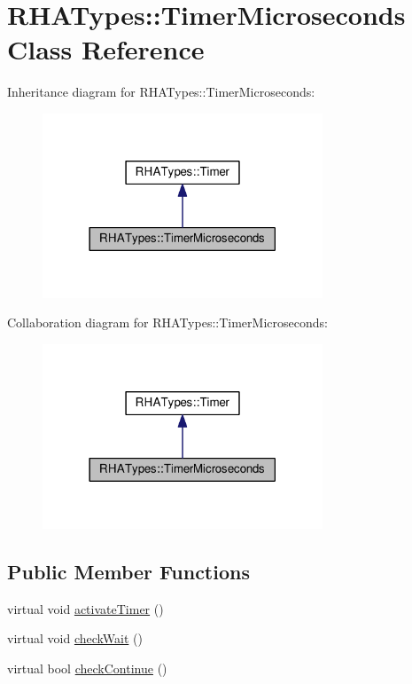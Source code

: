 \hypertarget{classRHATypes_1_1TimerMicroseconds}{}\section{R\+H\+A\+Types\+:\+:Timer\+Microseconds Class Reference}
\label{classRHATypes_1_1TimerMicroseconds}


Inheritance diagram for R\+H\+A\+Types\+:\+:Timer\+Microseconds\+:
\nopagebreak
\begin{figure}[H]
\begin{center}
\leavevmode
\includegraphics[width=237pt]{classRHATypes_1_1TimerMicroseconds__inherit__graph}
\end{center}
\end{figure}


Collaboration diagram for R\+H\+A\+Types\+:\+:Timer\+Microseconds\+:
\nopagebreak
\begin{figure}[H]
\begin{center}
\leavevmode
\includegraphics[width=237pt]{classRHATypes_1_1TimerMicroseconds__coll__graph}
\end{center}
\end{figure}
\subsection*{Public Member Functions}
\begin{DoxyCompactItemize}
\item 
virtual void \hyperlink{classRHATypes_1_1TimerMicroseconds_a453193b701218aaa0db1fc621f6f7e94}{activate\+Timer} ()
\item 
virtual void \hyperlink{classRHATypes_1_1TimerMicroseconds_a59a756d5b4643c33b3be2f02a8b7743f}{check\+Wait} ()
\item 
virtual bool \hyperlink{classRHATypes_1_1TimerMicroseconds_a3394628ac96864eb3204efde4efd80fc}{check\+Continue} ()
\end{DoxyCompactItemize}
